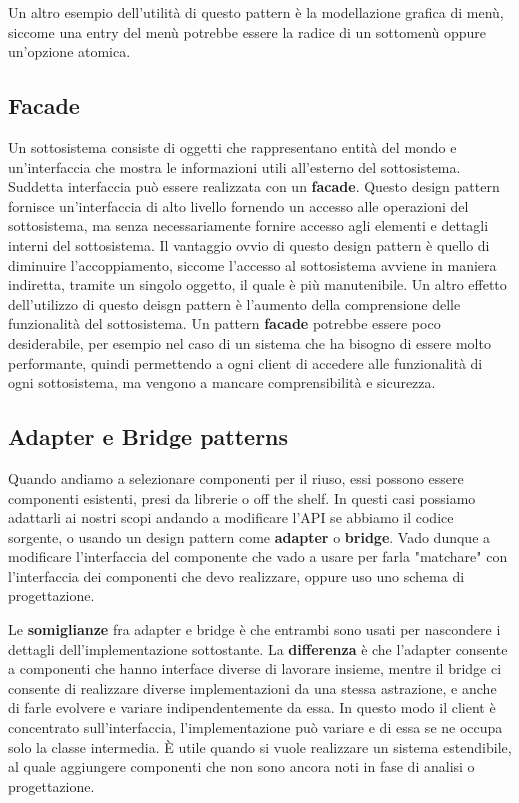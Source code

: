            Un altro esempio dell'utilità di questo pattern è la modellazione grafica di menù, siccome una entry del menù potrebbe essere la radice di un sottomenù oppure un'opzione atomica.
            
        \subsection{Facade}
            Un sottosistema consiste di oggetti che rappresentano entità del mondo e un'interfaccia che mostra le informazioni utili all'esterno del sottosistema. Suddetta interfaccia può essere realizzata con un \textbf{facade}. Questo design pattern fornisce un'interfaccia di alto livello fornendo un accesso alle operazioni del sottosistema, ma senza necessariamente fornire accesso agli elementi e dettagli interni del sottosistema. Il vantaggio ovvio di questo design pattern è quello di diminuire l'accoppiamento, siccome l'accesso al sottosistema avviene in maniera indiretta, tramite un singolo oggetto, il quale è più manutenibile. Un altro effetto dell'utilizzo di questo deisgn pattern è l'aumento della comprensione delle funzionalità del sottosistema. Un pattern \textbf{facade} potrebbe essere poco desiderabile, per esempio nel caso di un sistema che ha bisogno di essere molto performante, quindi permettendo a ogni client di accedere alle funzionalità di ogni sottosistema, ma vengono a mancare comprensibilità e sicurezza.
            
        \subsection{Adapter e Bridge patterns}
            Quando andiamo a selezionare componenti per il riuso, essi possono essere componenti esistenti, presi da librerie o off the shelf. In questi casi possiamo adattarli ai nostri scopi andando a modificare l'API se abbiamo il codice sorgente, o usando un design pattern come \textbf{adapter} o \textbf{bridge}. Vado dunque a modificare l'interfaccia del componente che vado a usare per farla "matchare" con l'interfaccia dei componenti che devo realizzare, oppure uso uno schema di progettazione.
            
            Le \textbf{somiglianze} fra adapter e bridge è che entrambi sono usati per nascondere i dettagli dell'implementazione sottostante. La \textbf{differenza} è che l'adapter consente a componenti che hanno interface diverse di lavorare insieme, mentre il bridge ci consente di realizzare diverse implementazioni da una stessa astrazione, e anche di farle evolvere e variare indipendentemente da essa. In questo modo il client è concentrato sull'interfaccia, l'implementazione può variare e di essa se ne occupa solo la classe intermedia. È utile quando si vuole realizzare un sistema estendibile, al quale aggiungere componenti che non sono ancora noti in fase di analisi o progettazione.
        

